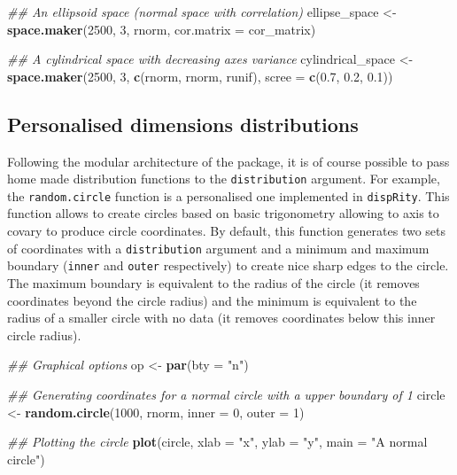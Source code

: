 \documentclass[]{book}
\newenvironment{Shaded}{\begin{snugshade}}{\end{snugshade}}
\newcommand{\CommentTok}[1]{\textcolor[rgb]{0.56,0.35,0.01}{\textit{#1}}}
\newcommand{\DataTypeTok}[1]{\textcolor[rgb]{0.13,0.29,0.53}{#1}}
\newcommand{\DecValTok}[1]{\textcolor[rgb]{0.00,0.00,0.81}{#1}}
\newcommand{\FloatTok}[1]{\textcolor[rgb]{0.00,0.00,0.81}{#1}}
\newcommand{\KeywordTok}[1]{\textcolor[rgb]{0.13,0.29,0.53}{\textbf{#1}}}
\newcommand{\NormalTok}[1]{#1}
\newcommand{\StringTok}[1]{\textcolor[rgb]{0.31,0.60,0.02}{#1}}
\begin{document}
\begin{Shaded}
\begin{Highlighting}[]
\CommentTok{## An ellipsoid space (normal space with correlation)}
\NormalTok{ellipse_space <-}\StringTok{ }\KeywordTok{space.maker}\NormalTok{(}\DecValTok{2500}\NormalTok{, }\DecValTok{3}\NormalTok{, rnorm,}
                             \DataTypeTok{cor.matrix =}\NormalTok{ cor_matrix)}

\CommentTok{## A cylindrical space with decreasing axes variance}
\NormalTok{cylindrical_space <-}\StringTok{ }\KeywordTok{space.maker}\NormalTok{(}\DecValTok{2500}\NormalTok{, }\DecValTok{3}\NormalTok{, }\KeywordTok{c}\NormalTok{(rnorm, rnorm, runif),}
                                 \DataTypeTok{scree =} \KeywordTok{c}\NormalTok{(}\FloatTok{0.7}\NormalTok{, }\FloatTok{0.2}\NormalTok{, }\FloatTok{0.1}\NormalTok{))}
\end{Highlighting}
\end{Shaded}

\hypertarget{personalised-dimensions-distributions}{%
\subsection{Personalised dimensions distributions}\label{personalised-dimensions-distributions}}

Following the modular architecture of the package, it is of course possible to pass home made distribution functions to the \texttt{distribution} argument.
For example, the \texttt{random.circle} function is a personalised one implemented in \texttt{dispRity}.
This function allows to create circles based on basic trigonometry allowing to axis to covary to produce circle coordinates.
By default, this function generates two sets of coordinates with a \texttt{distribution} argument and a minimum and maximum boundary (\texttt{inner} and \texttt{outer} respectively) to create nice sharp edges to the circle.
The maximum boundary is equivalent to the radius of the circle (it removes coordinates beyond the circle radius) and the minimum is equivalent to the radius of a smaller circle with no data (it removes coordinates below this inner circle radius).

\begin{Shaded}
\begin{Highlighting}[]
\CommentTok{## Graphical options}
\NormalTok{op <-}\StringTok{ }\KeywordTok{par}\NormalTok{(}\DataTypeTok{bty =} \StringTok{"n"}\NormalTok{)}

\CommentTok{## Generating coordinates for a normal circle with a upper boundary of 1}
\NormalTok{circle <-}\StringTok{ }\KeywordTok{random.circle}\NormalTok{(}\DecValTok{1000}\NormalTok{, rnorm, }\DataTypeTok{inner =} \DecValTok{0}\NormalTok{, }\DataTypeTok{outer =} \DecValTok{1}\NormalTok{)}

\CommentTok{## Plotting the circle}
\KeywordTok{plot}\NormalTok{(circle, }\DataTypeTok{xlab =} \StringTok{"x"}\NormalTok{, }\DataTypeTok{ylab =} \StringTok{"y"}\NormalTok{, }\DataTypeTok{main =} \StringTok{"A normal circle"}\NormalTok{)}
\end{Highlighting}
\end{Shaded}
\end{document}
